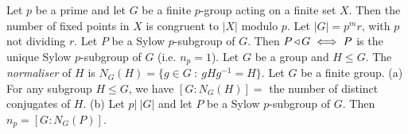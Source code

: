  Let $p$ be a prime and let $G$ be a finite $p$-group acting on a finite set $X$. Then the number of fixed points in $X$ is congruent to $|X|$ modulo $p$.
 Let $|G| = p^m r$, with $p$ not dividing $r$. Let $P$ be a Sylow $p$-subgroup of $G$. Then $P \operatorname{\triangleleft} G \iff P$ is the unique Sylow $p$-subgroup of $G$ (i.e. $n_p = 1$).
 Let $G$ be a group and $H \le G$. The \textit{normaliser} of $H$ is $N_G(H) = \{g \in G\ :\ gHg^{-1} = H\}$.
 Let $G$ be a finite group. 
(a) For any subgroup $H \le G$, we have $[G : N_G(H)] =$ the number of distinct conjugates of $H$. 
(b) Let $p |\ |G|$ and let $P$ be a Sylow $p$-subgroup of $G$. Then $n_p = [G:N_G (P)]$.